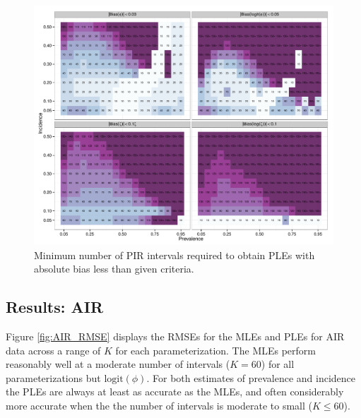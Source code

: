 \documentclass[man, noextraspace, floatsintext]{apa6}\usepackage[]{graphicx}\usepackage[]{color}
\makeatletter
\def\maxwidth{ %
  \ifdim\Gin@nat@width>\linewidth
    \linewidth
  \else
    \Gin@nat@width
  \fi
}
\newenvironment{knitrout}{}{} %
\newcommand{\logit}{\text{logit}}
\makeatother
\begin{document}
\begin{knitrout}
\color{fgcolor}\begin{figure}[tb]


{\centering \includegraphics[width=\maxwidth]{fig/PIR_sample_size} 

}

\caption[Minimum number of PIR intervals required to obtain PLEs with absolute bias less than given criteria]{Minimum number of PIR intervals required to obtain PLEs with absolute bias less than given criteria.\label{fig:PIR_sample_size}}
\end{figure}


\end{knitrout}

\subsection{Results: AIR}
Figure \ref{fig:AIR_RMSE} displays the RMSEs for the MLEs and PLEs for AIR data across a range of $K$ for each parameterization. The MLEs perform reasonably well at a moderate number of intervals ($K = 60$) for all parameterizations but $\logit(\phi)$. For both estimates of prevalence and incidence the PLEs are always at least as accurate as the MLEs, and often considerably more accurate when the the number of intervals is moderate to small ($K \leq 60$).
\end{document}
